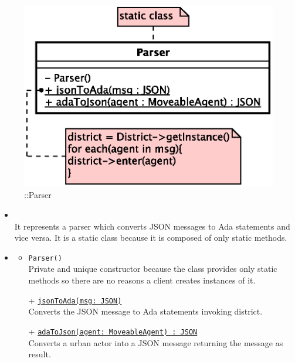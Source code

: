 \begin{figure}[h]
\centering
\includegraphics[scale=0.6,keepaspectratio]{images/solution/app/backend/parser.eps}
\caption{\pInterface::Parser}
\label{fig:sd-app-parser}
\end{figure}
\FloatBarrier
\begin{itemize}
  \item \textbf{\descr} \\
    It represents a parser which converts JSON messages to Ada statements and vice versa.
    It is a static class because it is composed of only static methods.
  \item \textbf{\ops}
  \begin{itemize}
   \item \texttt{Parser()} \\
   Private and unique constructor because the class provides only static methods 
    so there are no reasons a client creates instances of it.
    \item[+] \texttt{\underline{jsonToAda(msg: JSON)}} \\
    Converts the JSON message to Ada statements invoking district.
    \item[+] \texttt{\underline{adaToJson(agent: MoveableAgent) : JSON}} \\
    Converts a urban actor into a JSON message returning the message as result.
  \end{itemize}
\end{itemize}
